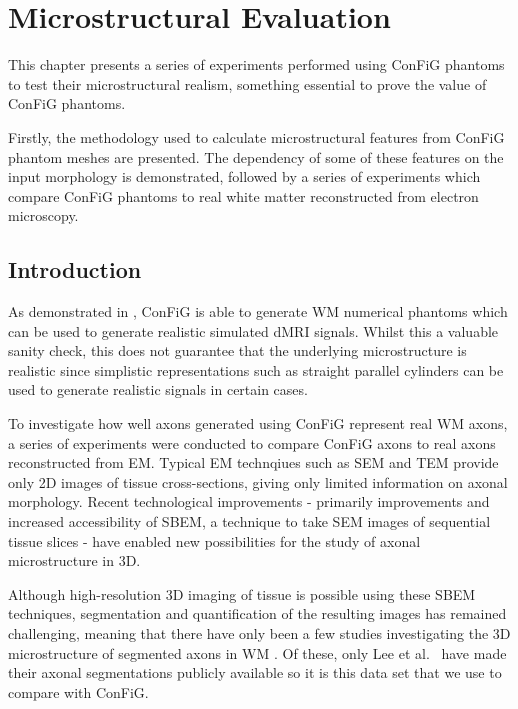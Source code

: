 \chapter{Microstructural Evaluation}
\label{chap:microstructure_eval}

\chaptertoc{}

\begin{chapterabstract}
  This chapter presents a series of experiments performed using ConFiG phantoms to test their microstructural realism, something essential to prove the value of ConFiG phantoms.

  Firstly, the methodology used to calculate microstructural features from ConFiG phantom meshes are presented. The dependency of some of these features on the input morphology is demonstrated, followed by a series of experiments which compare ConFiG phantoms to real white matter reconstructed from electron microscopy. 
\end{chapterabstract}



\section{Introduction}
\label{sec:micro_introduction}
As demonstrated in , ConFiG is able to generate \acf{WM} numerical phantoms which can be used to generate realistic simulated \acf{dMRI} signals. Whilst this a valuable sanity check, this does not guarantee that the underlying microstructure is realistic since simplistic representations such as straight parallel cylinders can be used to generate realistic signals in certain cases.

To investigate how well axons generated using ConFiG represent real \ac{WM} axons, a series of experiments were conducted to compare ConFiG axons to real axons reconstructed from \acf{EM}. Typical \ac{EM} technqiues such as \acf{SEM} and \acf{TEM} provide only 2D images of tissue cross-sections, giving only limited information on axonal morphology. Recent technological improvements - primarily improvements and increased accessibility of \acf{SBEM}\cite{Helmstaedter2008,Denk2004}, a technique to take \ac{SEM} images of sequential tissue slices - have enabled new possibilities for the study of axonal microstructure in 3D.

Although high-resolution 3D imaging of tissue is possible using these \ac{SBEM} techniques, segmentation and quantification of the resulting images has remained challenging, meaning that there have only been a few studies investigating the 3D microstructure of segmented axons in \ac{WM} \cite{Abdollahzadeh2019,Lee2019b,Salo2018}. Of these, only Lee et al.\ \cite{Lee2019b} have made their axonal segmentations publicly available so it is this data set that we use to compare with ConFiG.

